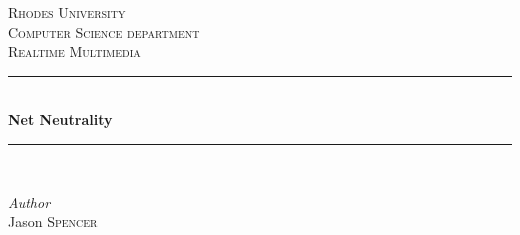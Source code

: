 \documentclass[11pt,a4paper]{newrucsthesis}
\begin{document}
	

\begin{titlepage} %
	\newcommand{\HRule}{\rule{\linewidth}{0.5mm}} %
	
	\center %
	
	
	\textsc{\LARGE Rhodes University}\\[1.5cm] %
	
	\textsc{\Large Computer Science department}\\[0.5cm] %
	
	\textsc{\large Realtime Multimedia}\\[0.5cm] %
	
	
	\HRule\\[0.4cm]
	
	{\huge\bfseries Net Neutrality}\\[0.4cm] %
	
	\HRule\\[1.5cm]
	
	
	\begin{minipage}{0.4\textwidth}
			\centering
			\large
			\textit{Author}\\
			Jason \textsc{Spencer} %
		
	\end{minipage}

	
	
	

\end{titlepage}
\end{document}

